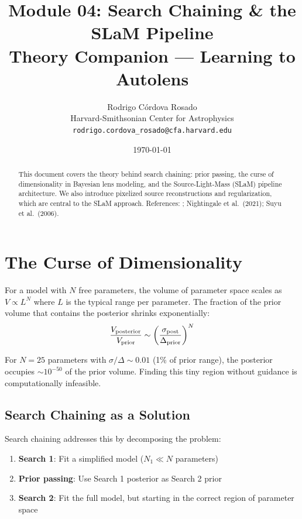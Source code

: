 \documentclass[11pt, letterpaper]{article}
\title{\textbf{Module 04: Search Chaining \& the SLaM Pipeline}\\[0.5em]
\large Theory Companion — Learning to Autolens}
\author{Rodrigo C\'ordova Rosado\\
\small Harvard-Smithsonian Center for Astrophysics\\
\small \texttt{rodrigo.cordova\_rosado@cfa.harvard.edu}}
\date{\today}
\begin{document}
\maketitle

\begin{abstract}
This document covers the theory behind search chaining: prior passing,
the curse of dimensionality in Bayesian lens modeling, and the Source-Light-Mass
(SLaM) pipeline architecture. We also introduce pixelized source
reconstructions and regularization, which are central to the SLaM
approach. References: \Night; Nightingale et al.\ (2021);
Suyu et al.\ (2006).
\end{abstract}

\tableofcontents
\newpage

\section{The Curse of Dimensionality}
\label{sec:dimensionality}

For a model with $N$ free parameters, the volume of parameter space
scales as $V \propto L^N$ where $L$ is the typical range per parameter.
The fraction of the prior volume that contains the posterior shrinks
exponentially:
\begin{equation}
\frac{V_{\rm posterior}}{V_{\rm prior}} \sim \left(\frac{\sigma_{\rm post}}{\Delta_{\rm prior}}\right)^N
\label{eq:curse}
\end{equation}

For $N = 25$ parameters with $\sigma/\Delta \sim 0.01$ (1\% of prior range),
the posterior occupies $\sim 10^{-50}$ of the prior volume. Finding this
tiny region without guidance is computationally infeasible.

\subsection{Search Chaining as a Solution}

Search chaining addresses this by decomposing the problem:
\begin{enumerate}[nosep]
  \item \textbf{Search 1}: Fit a simplified model ($N_1 \ll N$ parameters)
  \item \textbf{Prior passing}: Use Search 1 posterior as Search 2 prior
  \item \textbf{Search 2}: Fit the full model, but starting in the correct
    region of parameter space
\end{enumerate}
\end{document}
